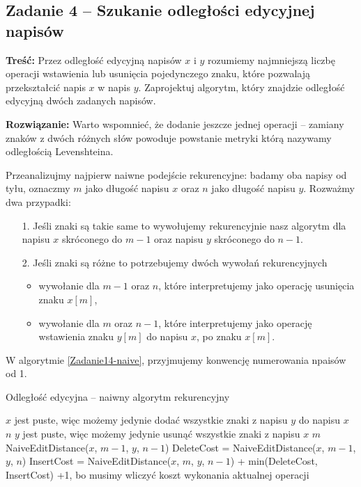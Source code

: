 \subsection{Zadanie 4 -- Szukanie odległości edycyjnej napisów}
\textbf{Treść:} Przez odległość edycyjną napisów 
$x$ i $y$ rozumiemy najmniejszą liczbę operacji wstawienia lub usunięcia
pojedynczego znaku, które pozwalają przekształcić napis $x$ w napis $y$.
Zaprojektuj algorytm, który znajdzie odległość 
edycyjną dwóch zadanych napisów.


\textbf{Rozwiązanie:}
Warto wspomnieć, że dodanie jeszcze jednej operacji --
zamiany znaków z dwóch różnych słów powoduje powstanie metryki
którą nazywamy odległością Levenshteina.

Przeanalizujmy najpierw naiwne podejście rekurencyjne: badamy 
oba napisy od tyłu, oznaczmy $m$ jako długość napisu $x$
oraz $n$ jako długość napisu $y$. Rozważmy dwa przypadki: 

\begin{itemize}
	\item[1.] Jeśli znaki są takie same to wywołujemy rekurencyjnie
	nasz algorytm dla napisu $x$ skróconego do $m - 1$ oraz 
	napisu $y$ skróconego do $n - 1$.
	\item[2.] Jeśli znaki są różne to potrzebujemy dwóch wywołań rekurencyjnych
	\begin{itemize}
		\item wywołanie dla $m - 1$ oraz $n$, które interpretujemy jako operację usunięcia znaku $x[m]$,
		\item wywołanie dla $m$ oraz $n - 1$, które
		interpretujemy jako operację wstawienia znaku $y[m]$ do napisu $x$,
		po znaku $x[m]$.
	\end{itemize} 
\end{itemize}

W algorytmie \ref{Zadanie14-naive}, przyjmujemy konwencję numerowania npaisów od 1.
\begin{algorithm}[H]
	\caption{Odległość edycyjna -- naiwny algorytm rekurencyjny}
	\begin{algorithmic}[1]
		\Comment $x$ jest puste, więc możemy jedynie dodać wszystkie znaki z napisu $y$ do napisu $x$
		\State \Return $n$ 
		\EndIf
		\Comment $y$ jest puste, więc możemy jedynie usunąć wszystkie znaki z napisu $x$
		\State \Return $m$ 
		\EndIf
		\State \Return NaiveEditDistance($x$, $m - 1$, $y$, $n - 1$)
		\Else
		\State DeleteCost = NaiveEditDistance($x$, $m - 1$, $y$, $n$)
		\State InsertCost = NaiveEditDistance($x$, $m$, $y$, $n - 1$)
		\State {} + min(DeleteCost, InsertCost) \Comment +1, bo musimy wliczyć koszt wykonania aktualnej operacji
		\EndIf
		\EndProcedure 
	\end{algorithmic}
	\label{Zadanie14-naive}
\end{algorithm}

